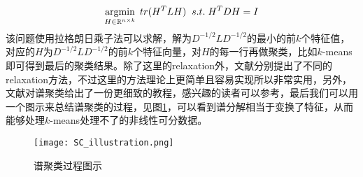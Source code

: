 \begin{equation*}
    \label{eq: relax_spectral_clustering}
    \operatorname*{argmin}\limits_{H \in \mathbb{R}^{n \times k}} \; tr(H^TLH) \;\; s.t.\;H^TDH=I
\end{equation*}
该问题使用拉格朗日乘子法可以求解，解为$D^{-1/2}LD^{-1/2}$的最小的前$k$个特征值，对应的$H$为$D^{-1/2}LD^{-1/2}$的前$k$个特征向量，对$H$的每一行再做聚类，比如$k$-means即可得到最后的聚类结果。除了这里的relaxation外，文献\cite{bie2006fast,bresson2013multiclass,rangapuram2014tight,rangapuram2016graph}分别提出了不同的relaxation方法，不过这里的方法理论上更简单且容易实现所以非常实用，另外，文献\cite{von2007tutorial}对谱聚类给出了一份更细致的教程，感兴趣的读者可以参考，最后我们可以用一个图示来总结谱聚类的过程，见图\ref{fig: SC_illustration}，可以看到谱分解相当于变换了特征，从而能够处理$k$-means处理不了的非线性可分数据。
\begin{figure}
    \texttt{[image: SC\_illustration.png]}
    \caption{谱聚类过程图示}
    \label{fig: SC_illustration}
\end{figure}